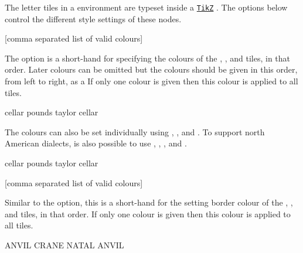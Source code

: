 \documentclass[svgnames]{report}
\newcommand\ctan[1]{\href{https://www.ctan.org/pkg/#1}{\texttt{#1}}}
\begin{document}
  The letter tiles in a  environment are typeset inside
  a \ctan{TikZ} \keyword{\node}. The options below control the different
  style settings of these nodes.

  [comma separated list of valid colours]

  The  option is a short-hand for specifying the colours
  of the , ,  and
   tiles, in that order. Later colours can be omitted but
  the colours should be given in this order, from left to right, as a
  If only one colour is given then this colour is applied to all tiles.

  \begin{example}
    \begin{wordle}[colours={LightGray,Orange,Teal}]{cellar}
      pounds
      taylor
      cellar
    \end{wordle}
  \end{example}

  The colours can also be set individually using ,
  ,  and .  To support north American dialects, is also possible to use
  , , ,
   and .

  \begin{example}
    \begin{wordle}[absent colour=DarkGray,present color=Salmon,
                   correct color=SeaGreen]{cellar}
      pounds
      taylor
      cellar
    \end{wordle}
  \end{example}

  [comma separated list of valid colours]

  Similar to the  option, this is a short-hand for the
  setting border colour of the , ,
   and  tiles, in that order.
  If only one colour is given then this colour is applied to all tiles.

  \begin{example}
    \begin{wordle}[borders={red, orange,blue}]{ANVIL}
      CRANE
      NATAL
      ANVIL
    \end{wordle}
  \end{example}
\end{document}
